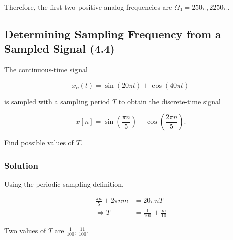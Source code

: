 Therefore, the first two positive analog frequencies are $\Omega_0 = 250 \pi, 2250 \pi$.

\subsection{Determining Sampling Frequency from a Sampled Signal (4.4)}

The continuous-time signal

\begin{equation}
    x_c (t) = \sin (20 \pi t) + \cos (40 \pi t)
\end{equation}

is sampled with a sampling period $T$ to obtain the discrete-time signal

\begin{equation}
    x[n] = \sin \left( \frac{\pi n}{5} \right) + \cos \left( \frac{2 \pi n}{5} \right).
\end{equation}

Find possible values of $T$.

\subsubsection{Solution}

Using the periodic sampling definition,

\begin{equation}
    \begin{aligned}
        \frac{{\pi n}}{5} + 2\pi nm &= 20\pi nT\\
         \Rightarrow T &= \frac{1}{{100}} + \frac{m}{{10}}
        \end{aligned}
\end{equation}

Two values of $T$ are $\frac{1}{100}, \frac{11}{100}$.


